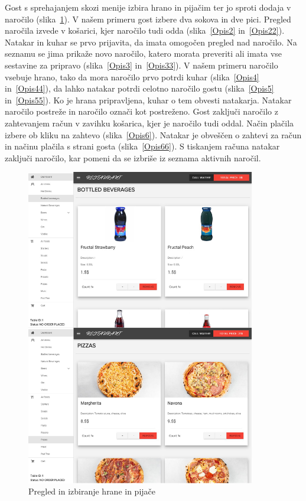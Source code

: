 \documentclass[a4paper, 12pt]{book}
\begin{document}
Gost s sprehajanjem skozi menije izbira hrano in pijačim ter jo sproti dodaja v naročilo (slika~\ref{Opis1}).
V našem primeru gost izbere dva sokova in dve pici. Pregled naročila izvede v košarici, kjer naročilo tudi odda (slika~\ref{Opis2} in~\ref{Opis22}). Natakar in kuhar se prvo prijavita, da imata omogočen pregled nad naročilo. Na seznamu se jima prikaže novo naročilo, katero morata preveriti ali imata vse sestavine za pripravo (slika~\ref{Opis3} in~\ref{Opis33}). V našem primeru naročilo vsebuje hrano, tako da mora naročilo prvo potrdi kuhar (slika~\ref{Opis4} in~\ref{Opis44}), da lahko natakar potrdi celotno naročilo gostu (slika~\ref{Opis5} in~\ref{Opis55}). Ko je hrana pripravljena, kuhar o tem obvesti natakarja. Natakar naročilo postreže in naročilo označi kot postreženo. Gost zaključi naročilo z zahtevanjem račun v zavihku košarica, kjer je naročilo tudi oddal. Način plačila izbere ob kliku na zahtevo (slika~\ref{Opis6}). Natakar je obveščen o zahtevi za račun in načinu plačila s strani gosta  (slika~\ref{Opis66}). S tiskanjem računa natakar zaključi naročilo, kar pomeni da se izbriše iz seznama aktivnih naročil.
\begin{figure}[!htb]
\centering
\includegraphics[width=10cm]{narocanje.jpg}
\caption{Pregled in izbiranje hrane in pijače}
\label{Opis1}
\end{figure}
\end{document}
